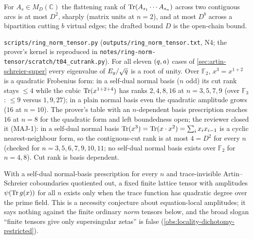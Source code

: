 \begin{proposition}
\label{prop:ring-cut-rank}
For $A_s\in M_D(\mathbb C)$ the flattening rank of $\operatorname{Tr}(A_{s_1}\cdots A_{s_n})$ across two
contiguous arcs is at most $D^2$, sharply (matrix units at $n = 2$), and at most $D^b$ across a
bipartition cutting $b$ virtual edges; the drafted bound $D$ is the open-chain bound.
\end{proposition}

\begin{numerical}
\label{num:cut-rank-binary}
\texttt{scripts/ring\_norm\_tensor.py} (\texttt{outputs/ring\_norm\_tensor.txt}, N4; the
prover's kernel is reproduced in \texttt{notes/ring-norm-tensor/scratch/t04\_cutrank.py}). For all
eleven $(q,a)$ cases of \cref{sec:artin-schreier-super} every eigenvalue of $E_g/\sqrt{q}$ is a
root of unity. Over $\mathbb F_2$, $x^3 = x^{1+2}$ is a quadratic Frobenius form: in a self-dual
normal basis ($n$ odd) its cut rank stays $\le4$ while the cubic $\operatorname{Tr}(x^{1+2+4})$ has ranks
$2,4,8,16$ at $n = 3,5,7,9$ (over $\mathbb F_3$: $\le9$ versus $1,9,27$); in a plain normal basis
even the quadratic amplitude grows ($16$ at $n = 10$). The prover's table with an
$n$-dependent basis prescription reaches $16$ at $n = 8$ for the quadratic form and left
boundedness open; the reviewer closed it (MAJ-1): in a self-dual normal basis
$\operatorname{Tr}(x^3) = \operatorname{Tr}(x\cdot x^2) = \sum_ix_ix_{i-1}$ is a cyclic nearest-neighbour form, so the
contiguous-cut rank is at most $4 = D^2$ for every $n$ (checked for $n = 3,5,6,7,9,10,11$; no
self-dual normal basis exists over $\mathbb F_2$ for $n = 4,8$). Cut rank is basis dependent.
\end{numerical}

\begin{conjecture}
\label{conj:amplitude-locality}
With a self-dual normal-basis prescription for every $n$ and trace-invisible Artin--Schreier
coboundaries quotiented out, a fixed finite lattice tensor with amplitudes $\psi(\operatorname{Tr} g(x))$ for %
all $n$ exists only when the trace function has quadratic degree over the prime field. This is a
necessity conjecture about equation-local amplitudes; it says nothing against the finite
ordinary \emph{norm} tensors below, and the broad slogan ``finite tensors give only
supersingular zetas'' is false (\cref{obs:locality-dichotomy-restricted}).
\end{conjecture}

